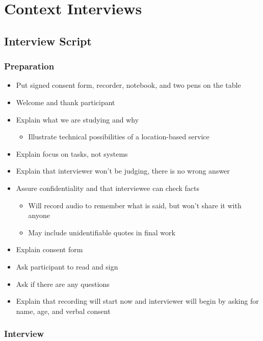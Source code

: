 \chapter{Context Interviews}
\label{app:interviews}

\section{Interview Script}
\label{app:interview-script}

\subsection*{Preparation}

\begin{itemize}
    \item Put signed consent form, recorder, notebook, and two pens on the table
    \item Welcome and thank participant
    \item Explain what we are studying and why
    \begin{itemize}
        \item Illustrate technical possibilities of a location-based service
    \end{itemize}
    \item Explain focus on tasks, not systems
    \item Explain that interviewer won’t be judging, there is no wrong answer
    \item Assure confidentiality and that interviewee can check facts
    \begin{itemize}
        \item Will record audio to remember what is said, but won’t share it with anyone
        \item May include unidentifiable quotes in final work
    \end{itemize}
    \item Explain consent form
    \item Ask participant to read and sign
    \item Ask if there are any questions
    \item Explain that recording will start now and interviewer will begin by asking for name, age, and verbal consent
\end{itemize}

\subsection*{Interview}


